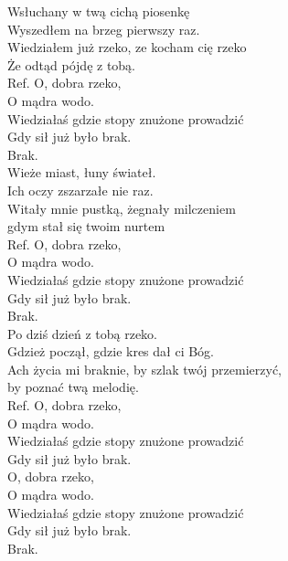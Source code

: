
\begin{flushleft}
Wsłuchany w twą cichą piosenkę \\
Wyszedłem na brzeg pierwszy raz. \\
Wiedziałem już rzeko, ze kocham cię rzeko  \\
Że odtąd pójdę z tobą. \tab{}\\
\vskip 3mm
Ref. O, dobra rzeko, \tab{}\tab{}\\
\hspace{0.9cm}O mądra wodo.\tab{} \tab{}\\
\hspace{0.9cm}Wiedziałaś gdzie stopy znużone prowadzić  \\
\hspace{0.9cm}Gdy sił już było brak.\tab{} \tab{}\\
\hspace{0.9cm}Brak. \tab{}\tab{}\tab{}\\
\vskip 3mm
Wieże miast, łuny świateł. \\
Ich oczy zszarzałe nie raz. \\
Witały mnie pustką, żegnały milczeniem \\
gdym stał się twoim nurtem \\
\vskip 3mm
Ref. O, dobra rzeko,\\
\hspace{0.9cm}O mądra wodo. \\
\hspace{0.9cm}Wiedziałaś gdzie stopy znużone prowadzić \\
\hspace{0.9cm}Gdy sił już było brak. \\
\hspace{0.9cm}Brak. \\
\vskip 3mm
Po dziś dzień z tobą rzeko. \\
Gdzież począł, gdzie kres dał ci Bóg. \\
Ach życia mi braknie, by szlak twój przemierzyć, \\
by poznać twą melodię.  \\
\vskip 3mm
Ref. O, dobra rzeko,\\
\hspace{0.9cm}O mądra wodo. \\
\hspace{0.9cm}Wiedziałaś gdzie stopy znużone prowadzić \\
\hspace{0.9cm}Gdy sił już było brak. \\
\vskip 3mm
\hspace{0.9cm}O, dobra rzeko,\\
\hspace{0.9cm}O mądra wodo. \\
\hspace{0.9cm}Wiedziałaś gdzie stopy znużone prowadzić \\
\hspace{0.9cm}Gdy sił już było brak. \\
\vskip 3mm
\hspace{0.9cm}Brak. \\
\end{flushleft}
\clearpage
